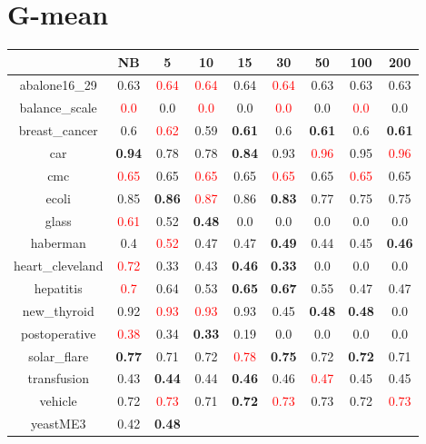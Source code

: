 \documentclass{article}%
\begin{document}
\section*{G{-}mean}%
\begin{tabular}{c|cccccccc}%
\hline%
&NB&5&10&15&30&50&100&200\\%
\hline%
abalone16\_29&0.63&\textcolor{red}{ 
0.64
}&\textcolor{red}{ 
0.64
}&0.64&\textcolor{red}{ 
0.64
}&0.63&0.63&0.63\\%
\hline%
balance\_scale&\textcolor{red}{ 
0.0
}&0.0&\textcolor{red}{ 
0.0
}&0.0&\textcolor{red}{ 
0.0
}&0.0&\textcolor{red}{ 
0.0
}&0.0\\%
\hline%
breast\_cancer&0.6&\textcolor{red}{ 
0.62
}&0.59&\textbf{0.61}&0.6&\textbf{0.61}&0.6&\textbf{0.61}\\%
\hline%
car&\textbf{0.94}&0.78&0.78&\textbf{0.84}&0.93&\textcolor{red}{ 
0.96
}&0.95&\textcolor{red}{ 
0.96
}\\%
\hline%
cmc&\textcolor{red}{ 
0.65
}&0.65&\textcolor{red}{ 
0.65
}&0.65&\textcolor{red}{ 
0.65
}&0.65&\textcolor{red}{ 
0.65
}&0.65\\%
\hline%
ecoli&0.85&\textbf{0.86}&\textcolor{red}{ 
0.87
}&0.86&\textbf{0.83}&0.77&0.75&0.75\\%
\hline%
glass&\textcolor{red}{ 
0.61
}&0.52&\textbf{0.48}&0.0&0.0&0.0&0.0&0.0\\%
\hline%
haberman&0.4&\textcolor{red}{ 
0.52
}&0.47&0.47&\textbf{0.49}&0.44&0.45&\textbf{0.46}\\%
\hline%
heart\_cleveland&\textcolor{red}{ 
0.72
}&0.33&0.43&\textbf{0.46}&\textbf{0.33}&0.0&0.0&0.0\\%
\hline%
hepatitis&\textcolor{red}{ 
0.7
}&0.64&0.53&\textbf{0.65}&\textbf{0.67}&0.55&0.47&0.47\\%
\hline%
new\_thyroid&0.92&\textcolor{red}{ 
0.93
}&\textcolor{red}{ 
0.93
}&0.93&0.45&\textbf{0.48}&\textbf{0.48}&0.0\\%
\hline%
postoperative&\textcolor{red}{ 
0.38
}&0.34&\textbf{0.33}&0.19&0.0&0.0&0.0&0.0\\%
\hline%
solar\_flare&\textbf{0.77}&0.71&0.72&\textcolor{red}{ 
0.78
}&\textbf{0.75}&0.72&\textbf{0.72}&0.71\\%
\hline%
transfusion&0.43&\textbf{0.44}&0.44&\textbf{0.46}&0.46&\textcolor{red}{ 
0.47
}&0.45&0.45\\%
\hline%
vehicle&0.72&\textcolor{red}{ 
0.73
}&0.71&\textbf{0.72}&\textcolor{red}{ 
0.73
}&0.73&0.72&\textcolor{red}{ 
0.73
}\\%
\hline%
yeastME3&0.42&\textbf{0.48}&\textcolor{red}{ 
}
\end{tabular}
\end{document}
